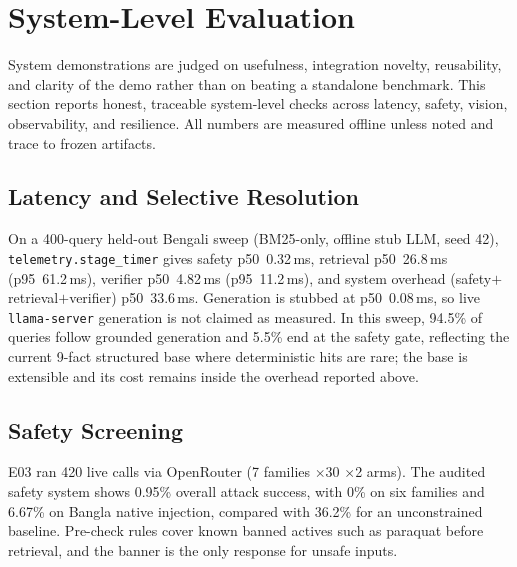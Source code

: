 \section{System-Level Evaluation}
\label{sec:empirical_usability}

System demonstrations are judged on usefulness, integration novelty, reusability, and clarity of the demo rather than on beating a standalone benchmark. This section reports honest, traceable system-level checks across latency, safety, vision, observability, and resilience. All numbers are measured offline unless noted and trace to frozen artifacts.

\subsection{Latency and Selective Resolution}
On a 400-query held-out Bengali sweep (BM25-only, offline stub LLM, seed 42), \texttt{telemetry.stage\_timer} gives safety p50~0.32\,ms, retrieval p50~26.8\,ms (p95~61.2\,ms), verifier p50~4.82\,ms (p95~11.2\,ms), and system overhead (safety$+$retrieval$+$verifier) p50~33.6\,ms. Generation is stubbed at p50~0.08\,ms, so live \texttt{llama-server} generation is not claimed as measured. In this sweep, 94.5\% of queries follow grounded generation and 5.5\% end at the safety gate, reflecting the current 9-fact structured base where deterministic hits are rare; the base is extensible and its cost remains inside the overhead reported above.

\subsection{Safety Screening}
E03 ran 420 live calls via OpenRouter (7 families $\times$30 $\times$2 arms). The audited safety system shows 0.95\% overall attack success, with 0\% on six families and 6.67\% on Bangla native injection, compared with 36.2\% for an unconstrained baseline. Pre-check rules cover known banned actives such as paraquat before retrieval, and the banner is the only response for unsafe inputs.

